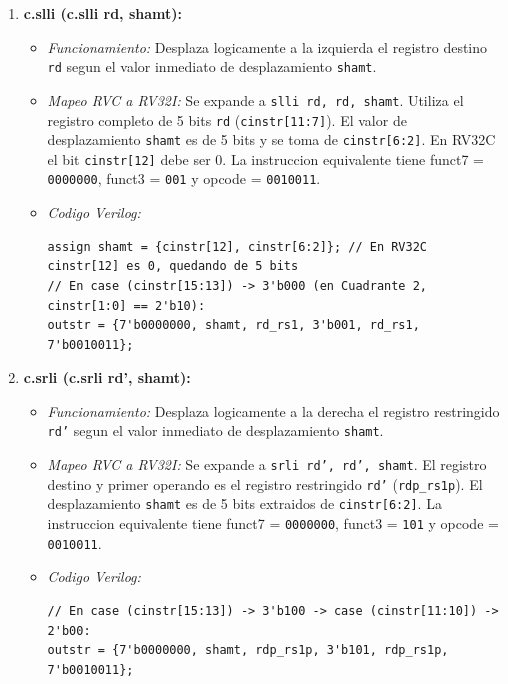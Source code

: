 \documentclass[12pt, a4paper]{article}
\begin{document}
\begin{enumerate}
    \item \textbf{c.slli (c.slli rd, shamt):}
    \begin{itemize}
        \item \textit{Funcionamiento:} Desplaza logicamente a la izquierda el registro destino \texttt{rd} segun el valor inmediato de desplazamiento \texttt{shamt}.
        \item \textit{Mapeo RVC a RV32I:} Se expande a \texttt{slli rd, rd, shamt}. Utiliza el registro completo de 5 bits \texttt{rd} (\texttt{cinstr[11:7]}). El valor de desplazamiento \texttt{shamt} es de 5 bits y se toma de \texttt{cinstr[6:2]}. En RV32C el bit \texttt{cinstr[12]} debe ser 0. La instruccion equivalente tiene funct7 = \texttt{0000000}, funct3 = \texttt{001} y opcode = \texttt{0010011}.
        \item \textit{Codigo Verilog:}
        \begin{lstlisting}[style=verilogstyle]
assign shamt = {cinstr[12], cinstr[6:2]}; // En RV32C cinstr[12] es 0, quedando de 5 bits
// En case (cinstr[15:13]) -> 3'b000 (en Cuadrante 2, cinstr[1:0] == 2'b10):
outstr = {7'b0000000, shamt, rd_rs1, 3'b001, rd_rs1, 7'b0010011};
        \end{lstlisting}
    \end{itemize}

    \item \textbf{c.srli (c.srli rd', shamt):}
    \begin{itemize}
        \item \textit{Funcionamiento:} Desplaza logicamente a la derecha el registro restringido \texttt{rd'} segun el valor inmediato de desplazamiento \texttt{shamt}.
        \item \textit{Mapeo RVC a RV32I:} Se expande a \texttt{srli rd', rd', shamt}. El registro destino y primer operando es el registro restringido \texttt{rd'} (\texttt{rdp\_rs1p}). El desplazamiento \texttt{shamt} es de 5 bits extraidos de \texttt{cinstr[6:2]}. La instruccion equivalente tiene funct7 = \texttt{0000000}, funct3 = \texttt{101} y opcode = \texttt{0010011}.
        \item \textit{Codigo Verilog:}
        \begin{lstlisting}[style=verilogstyle]
// En case (cinstr[15:13]) -> 3'b100 -> case (cinstr[11:10]) -> 2'b00:
outstr = {7'b0000000, shamt, rdp_rs1p, 3'b101, rdp_rs1p, 7'b0010011};
        \end{lstlisting}
    \end{itemize}


\end{enumerate}
\end{document}
